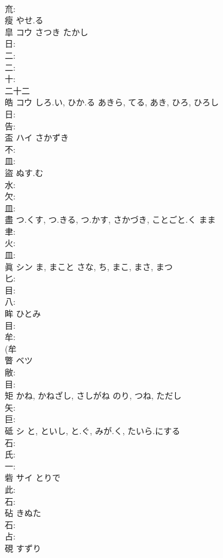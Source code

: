 \documentclass[8pt]{extreport}
\begin{document}
\begin{CJK}{UTF8}{min}
\\	㐬: 
\\	瘦		やせ.る				
\\	皐	コウ	さつき	たかし	
\\	日: 
\\	二: 
\\	二: 
\\	十: 
\\	二十二 
\\	皓	コウ	しろ.い, ひか.る	あきら, てる, あき, ひろ, ひろし	
\\	日: 
\\	告: 
\\	盃	ハイ	さかずき				
\\	不: 
\\	皿: 
\\	盜		ぬす.む				
\\	水: 
\\	欠: 
\\	皿: 
\\	盡		つ.くす, つ.きる, つ.かす, さかづき, ことごと.く	まま			
\\	聿: 
\\	火: 
\\	皿: 
\\	眞	シン	ま, まこと	さな, ち, まこ, まさ, まつ	
\\	匕: 
\\	目: 
\\	八: 
\\	眸		ひとみ				
\\	目: 
\\	牟: 
\\	(牟 
\\	瞥	ベツ			
\\	敝: 
\\	目: 
\\	矩		かね, かねざし, さしがね	のり, つね, ただし			
\\	矢: 
\\	巨: 
\\	砥	シ	と, といし, と.ぐ, みが.く, たいら.にする		
\\	石: 
\\	氏: 
\\	一: 
\\	砦	サイ	とりで		
\\	此: 
\\	石: 
\\	砧		きぬた				
\\	石: 
\\	占: 
\\	硯		すずり				

\end{CJK}
\end{document}
